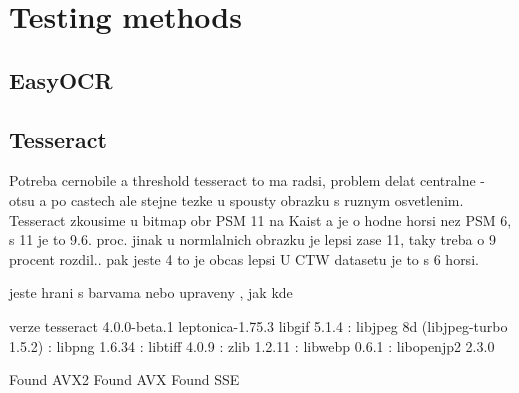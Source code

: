\chapter{Testing methods}

\section{EasyOCR}



\section{Tesseract}
Potreba cernobile a threshold tesseract to ma radsi, problem delat centralne - otsu a po castech ale stejne tezke u spousty obrazku s ruznym osvetlenim.
Tesseract zkousime u bitmap obr PSM 11 na Kaist a je o hodne horsi nez PSM 6, s 11 je to 9.6. proc. jinak u normlalnich obrazku je lepsi zase 11, taky treba o 9 procent rozdil.. pak jeste 4 to je obcas lepsi
U CTW datasetu je to s 6 horsi.

jeste hrani s barvama nebo upraveny , jak kde

verze
tesseract 4.0.0-beta.1
 leptonica-1.75.3
  libgif 5.1.4 : libjpeg 8d (libjpeg-turbo 1.5.2) : libpng 1.6.34 : libtiff 4.0.9 : zlib 1.2.11 : libwebp 0.6.1 : libopenjp2 2.3.0

 Found AVX2
 Found AVX
 Found SSE

\section{}